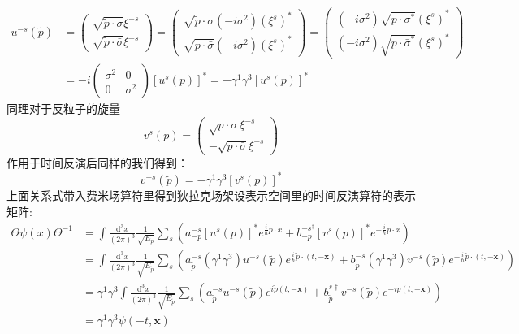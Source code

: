 \documentclass{article}
\numberwithin{equation}{subsection}
\begin{document}
\begin{equation}
    \begin{split}
        u^{-s}(\tilde{p})&=\begin{pmatrix}
            \sqrt{\tilde{p}\cdot\sigma}\xi^{-s}\\
            \sqrt{\tilde{p}\cdot\bar{\sigma}}\xi^{-s}
        \end{pmatrix}=\begin{pmatrix}
            \sqrt{\tilde{p}\cdot\sigma}(-i\sigma^2)(\xi^s)^*\\
            \sqrt{\tilde{p}\cdot\bar{\sigma}}(-i\sigma^2)(\xi^s)^*
        \end{pmatrix}=\begin{pmatrix}
            (-i\sigma^2)\sqrt{p\cdot\sigma^*}(\xi^s)^*\\
            (-i\sigma^2)\sqrt{p\cdot\bar{\sigma}^*}(\xi^s)^*
        \end{pmatrix}\\
        &=-i\begin{pmatrix}
            \sigma^2&0\\
            0&\sigma^2
        \end{pmatrix}[u^s(p)]^*=-\gamma^1\gamma^3[u^s(p)]^*
    \end{split}
\end{equation}
同理对于反粒子的旋量
\begin{equation}
    v^s(p)=\begin{pmatrix}
        \sqrt{p\cdot\sigma}\xi^{-s}\\
        -\sqrt{p\cdot\bar{\sigma}}\xi^{-s}
    \end{pmatrix}
\end{equation}
作用于时间反演后同样的我们得到：
\begin{equation}
    v^{-s}(\tilde{p})=-\gamma^1\gamma^3[v^s(p)]^*
\end{equation}
上面关系式带入费米场算符里得到狄拉克场架设表示空间里的时间反演算符的表示矩阵:
\begin{equation}
    \begin{split}
        \Theta\psi(x)\Theta^{-1}&=\int\frac{\mathrm{d}^3x}{(2\pi)^3}\frac{1}{\sqrt{E_{p}}}\sum_{s}\left(a_{-p}^{-s}[u^s(p)]^*e^{\frac{i}{\hbar}p\cdot x}+b_{-p}^{-s^\dagger}[v^{s}(p)]^*e^{-\frac{i}{\hbar}p\cdot x}\right)\\
        &=\int\frac{\mathrm{d}^3x}{(2\pi)^3}\frac{1}{\sqrt{E_{\tilde{p}}}}\sum_{s}\left(a_{\tilde{p}}^{-s}(\gamma^1\gamma^3)u^{-s}(\tilde{p})e^{\frac{i}{\hbar}\tilde{p}\cdot(t,-\mathbf{x})}+b_{\tilde{p}}^{-s}(\gamma^1\gamma^3)v^{-s}(\tilde{p})e^{-\frac{i}{\hbar}\tilde{p}\cdot(t,-\mathbf{x})}\right)\\
        &=\gamma^1\gamma^3\int\frac{\mathrm{d}^3x}{(2\pi)^3}\frac{1}{\sqrt{E_{\tilde{p}}}}\sum_{s}\left(a_{\tilde{p}}^{-s}u^{-s}(\tilde{p})e^{i\tilde{p}(t,-\mathbf{x})}+b_{\tilde{p}}^{s\dagger}v^{-s}(\tilde{p})e^{-ip(t,-\mathbf{x})}\right)\\
        &=\gamma^1\gamma^3\psi(-t,\mathbf{x})
    \end{split}
\end{equation}
\end{document}
